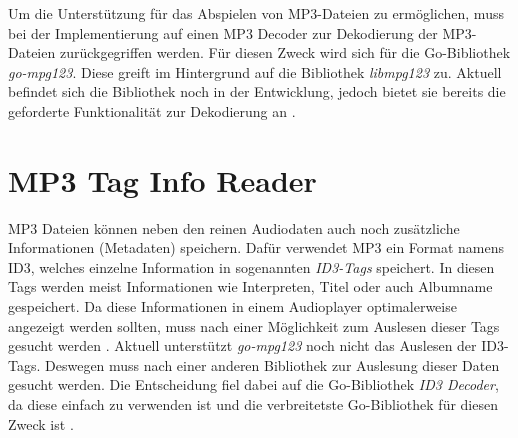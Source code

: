 Um die Unterstützung für das Abspielen von \ac{MP3}-Dateien zu ermöglichen,
muss bei der Implementierung auf einen \ac{MP3} Decoder zur Dekodierung
der \ac{MP3}-Dateien zurückgegriffen werden. Für diesen Zweck wird sich für die
Go-Bibliothek \textit{go-mpg123}. Diese greift im
Hintergrund auf die Bibliothek \textit{libmpg123} zu. Aktuell befindet sich die
Bibliothek noch in der Entwicklung, jedoch bietet sie bereits die
geforderte Funktionalität zur Dekodierung an \autocite{mp3_decoder}.

\section{\acs{MP3} Tag Info Reader}
\ac{MP3} Dateien können neben den reinen Audiodaten auch noch zusätzliche
Informationen (Metadaten) speichern. Dafür verwendet \ac{MP3} ein Format namens
\ac{ID3}, welches einzelne Information in
sogenannten \textit{\ac{ID3}-Tags} speichert. In diesen Tags werden meist
Informationen wie Interpreten, Titel oder auch Albumname gespeichert. Da diese
Informationen in einem Audioplayer optimalerweise angezeigt werden sollten,
muss nach einer Möglichkeit zum Auslesen dieser Tags gesucht werden \autocite{id3}. \hfill
\break
Aktuell unterstützt \textit{go-mpg123} noch nicht das Auslesen der \ac{ID3}-Tags.
Deswegen muss nach einer anderen Bibliothek zur Auslesung dieser Daten gesucht
werden. Die Entscheidung fiel dabei auf die Go-Bibliothek \textit{ID3 Decoder},
da diese einfach zu verwenden ist und die verbreitetste Go-Bibliothek
für diesen Zweck ist \autocite{id3_go_2015}.
